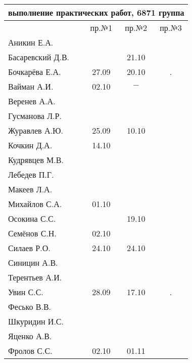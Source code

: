 \documentclass[a4paper,landscape,11pt]{article}
\begin{document}
\begin{tabular}{l|ccc}
\multicolumn{4}{c}{выполнение практических работ, 6871 группа} \\
\toprule
& пр.№1 & пр.№2  &  пр.№3 \\
\midrule
Аникин Е.А.     &     &     &\\    
Басаревский Д.В.&     &21.10&\\
Бочкарёва Е.А.  &27.09&20.10& . \\
Вайман А.И.     &02.10&$-$  &\\
Веренев А.А.    &     &     &\\
Гусманова Л.Р.  &     &     &\\
Журавлев А.Ю.   &25.09&10.10&\\
Кочкин Д.А.     &14.10&     &\\
Кудрявцев М.В.  &     &     &\\
Лебедев П.Г.    &     &     &\\
Макеев Л.А.     &     &     &\\
Михайлов С.А.   &01.10&     &\\
Осокина С.С.    &     &19.10&\\
Семёнов С.Н.    &02.10&     &\\
Силаев Р.О.     &24.10&24.10&\\
Синицин А.В.    &     &     &\\
Терентьев А.И.  &     &     &\\
Увин С.С.       &28.09&17.10& . \\
Фесько В.В.     &     &     &\\
Шкуридин И.С.   &     &     &\\
Яценко А.В.     &     &     &\\
Фролов С.С.     &02.10&01.11&\\
\bottomrule
\end{tabular}
\end{document}
